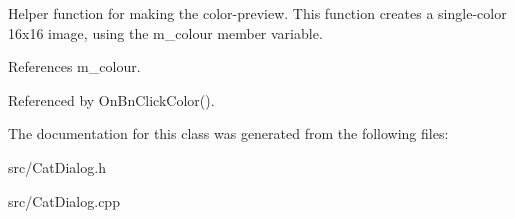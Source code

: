 Helper function for making the color-\/preview. This function creates a single-\/color 16x16 image, using the m\_\-colour member variable. 

References m\_\-colour.

Referenced by OnBnClickColor().

The documentation for this class was generated from the following files:\begin{DoxyCompactItemize}
\item 
src/CatDialog.h\item 
src/CatDialog.cpp\end{DoxyCompactItemize}
